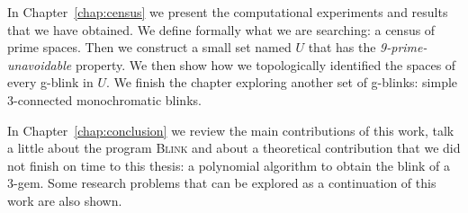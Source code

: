 In Chapter~\ref{chap:census} we present the computational
experiments and results that we have obtained. We define formally
what we are searching: a census of prime spaces. Then we construct
a small set named $U$ that has the {\it 9-prime-unavoidable} property.
We then show how we topologically identified the spaces of every
g-blink in $U$. We finish the chapter exploring another set of
g-blinks: simple 3-connected monochromatic blinks.

In Chapter~\ref{chap:conclusion} we review the main contributions
of this work, talk a little about the program \textsc{Blink} and
about a theoretical contribution that we did not finish on
time to this thesis: a polynomial algorithm to obtain the blink
of a 3-gem. Some research problems that can be explored as a
continuation of this work are also shown.








